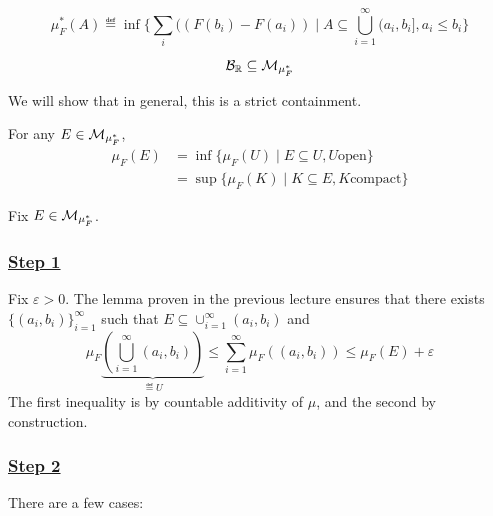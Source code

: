 \documentclass[x11names,reqno,14pt]{extarticle}
\newcommand*{\oo}{\infty}
\newcommand{\seq}[1]{_{#1 = 1}^\oo}
\begin{document}
\[
\mu^*_F(A) \eqdef \inf\{\sum_{i}((F(b_i) - F(a_i)) \mid A \subseteq \bigcup\seq{i}(a_i, b_i], a_i\leq b_i \}
\]

\thm 
\[
\mathcal{B}_{\mathbb{R}} \subseteq \mathcal{M}_{\mu^*_F}
\]

We will show that in general, this is a strict containment. 

\thm For any $E \in \mathcal{M}_{\mu^*_F}$, 
\begin{align*}
\mu_F(E) & = \inf\{\mu_F(U) \mid E \subseteq U, U \text{open}\} \\
			& = \sup\{\mu_F(K) \mid K \subseteq E, K \text{compact}\}
\end{align*}

\proof

Fix $E \in \mathcal{M}_{\mu^*_F}$. 

\subsubsection*{\underline{Step 1}}

Fix $\varepsilon>0$. The lemma proven in the previous lecture ensures that there exists $\{(a_i, b_i)\}\seq{i}$ such that $E \subseteq \cup\seq{i}(a_i, b_i)$ and 
\[
\mu_F\underbrace{\left(\bigcup\seq{i}(a_i, b_i)\right)}_{\eqdef U} \leq \sum\seq{i}\mu_F((a_i, b_i)) \leq \mu_F(E) + \varepsilon
\]
The first inequality is by countable additivity of $\mu$, and the second by construction. 

\subsubsection*{\underline{Step 2}}

There are a few cases:
\end{document}
